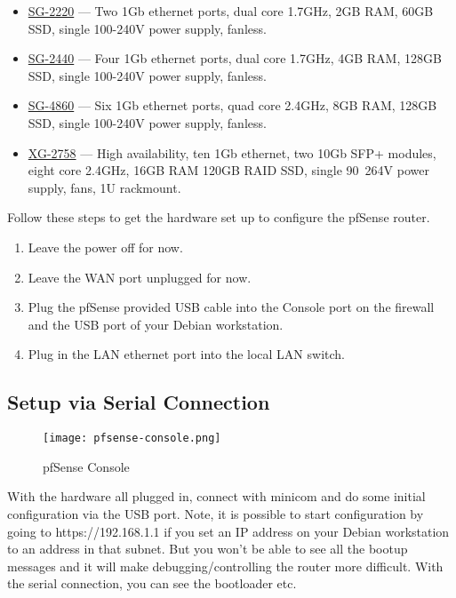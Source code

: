 \begin{itemize}
 \item \href{https://store.pfsense.org/SG-2220/}{SG-2220} --- Two 1Gb ethernet ports, dual core 1.7GHz, 2GB RAM, 60GB SSD, single 100-240V power supply, fanless.
 \item \href{https://store.pfsense.org/SG-2440/}{SG-2440} --- Four 1Gb ethernet ports, dual core 1.7GHz, 4GB RAM, 128GB SSD, single 100-240V power supply, fanless.
 \item \href{https://store.pfsense.org/SG-4860/}{SG-4860} --- Six 1Gb ethernet ports, quad core 2.4GHz, 8GB RAM, 128GB SSD, single 100-240V power supply, fanless.
 \item \href{https://store.pfsense.org/XG-2758-HA.aspx}{XG-2758} --- High availability, ten 1Gb ethernet, two 10Gb SFP+ modules, eight core 2.4GHz, 16GB RAM 120GB RAID SSD, single 90~264V power supply, fans, 1U rackmount.
\end{itemize}

Follow these steps to get the hardware set up to configure the pfSense router.

\begin{enumerate}
 \item Leave the power off for now.
 \item Leave the WAN port unplugged for now.
 \item Plug the pfSense provided USB cable into the Console port on the firewall and the USB port of your Debian workstation.
 \item Plug in the LAN ethernet port into the local LAN switch.
\end{enumerate}

\subsection{Setup via Serial Connection}
\begin{figure}[h!]
\begin{center}
\texttt{[image: pfsense-console.png]}
 \caption{pfSense Console}
 \label{fig:pfsense-console}
\end{center}
\end{figure}

With the hardware all plugged in, connect with minicom and do some initial configuration via the USB port.
Note, it is possible to start configuration by going to https://192.168.1.1 if you set an IP address on your
Debian workstation to an address in that subnet. But you won't be able to see all the bootup messages and it
will make debugging/controlling the router more difficult. With the serial connection, you can see the bootloader etc.

